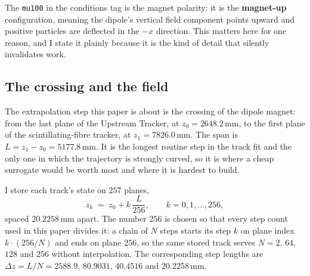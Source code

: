 \documentclass[11pt,a4paper]{article}
\newcommand{\mm}{\ensuremath{\,\mathrm{mm}}}
\begin{document}
The \texttt{mu100} in the conditions tag is the magnet polarity: it is the
\textbf{magnet-up} configuration, meaning the dipole's vertical field component
points upward and positive particles are deflected in the $-x$ direction. This
matters here for one reason, and I state it plainly because it is the kind of
detail that silently invalidates work.

\begin{quote}
\end{quote}

\subsection{The crossing and the field}
\label{sec:data-crossing}

The extrapolation step this paper is about is the crossing of the dipole magnet:
from the last plane of the Upstream Tracker, at $z_0 = 2648.2\mm$, to the first
plane of the scintillating-fibre tracker, at $z_1 = 7826.0\mm$. The span is
$L = z_1 - z_0 = 5177.8\mm$. It is the longest routine step in the track fit and
the only one in which the trajectory is strongly curved, so it is where a cheap
surrogate would be worth most and where it is hardest to build.

I store each track's state on $257$ planes,
\begin{equation}
  z_k \;=\; z_0 + k\,\frac{L}{256}, \qquad k = 0, 1, \dots, 256,
  \label{eq:planes}
\end{equation}
spaced $20.2258\mm$ apart. The number $256$ is chosen so that every step count
used in this paper divides it: a chain of $N$ steps starts its step $k$ on plane
index $k \cdot (256/N)$ and ends on plane $256$, so the same stored track serves
$N = 2$, $64$, $128$ and $256$ without interpolation. The corresponding step
lengths are $\Delta z = L/N = 2588.9$, $80.9031$, $40.4516$ and $20.2258\mm$.
\end{document}

